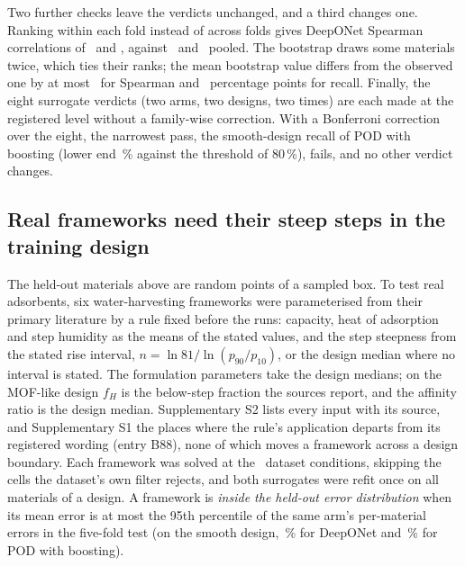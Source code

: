 \documentclass[10pt,a4paper]{article}
\begin{document}
Two further checks leave the verdicts unchanged, and a third changes one. Ranking within
each fold instead of across folds gives DeepONet Spearman correlations of
\nWithinFoldVtwoDonSp\ and \nWithinFoldVthreeDonSp, against \nScrDonSp\ and
\nScrVthreeDonSp\ pooled. The bootstrap draws some materials twice, which ties their ranks;
the mean bootstrap value differs from the observed one by at most \nTieBiasMax\ for Spearman
and \nTieBiasRcMax\ percentage points for recall. Finally, the eight surrogate verdicts (two arms, two designs,
two times) are each made at the registered level without a family-wise correction. With a
Bonferroni correction over the eight, the narrowest pass, the smooth-design recall of POD
with boosting (lower end \nScrHgbRcLo\,\% against the threshold of 80\,\%), fails, and no
other verdict changes.

\subsection{Real frameworks need their steep steps in the training design}
\label{sec:frameworks}

The held-out materials above are random points of a sampled box. To test real adsorbents,
six water-harvesting frameworks were parameterised from their primary literature by a rule fixed before the runs:
capacity, heat of adsorption and step humidity as the means of the stated values, and the
step steepness from the stated rise interval, \(n = \ln 81/\ln(p_{90}/p_{10})\), or the
design median where no interval is stated. The formulation parameters take the design
medians; on the MOF-like design \(f_H\) is the below-step fraction the sources report, and
the affinity ratio is the design median. Supplementary S2 lists every input with its
source, and Supplementary S1 the places where the rule's application departs from its
registered wording (entry B88), none of which moves a framework across a design boundary.
Each framework was solved at the \nDataNconditions\ dataset conditions, skipping the cells
the dataset's own filter rejects, and both surrogates were refit once on all materials of
a design. A framework is \emph{inside the held-out error distribution} when its mean error
is at most the 95th percentile of the same arm's per-material errors in the five-fold test
(on the smooth design, \nFwDonPninetyfive\,\% for DeepONet and \nFwHgbPninetyfive\,\% for POD
with boosting).
\end{document}
